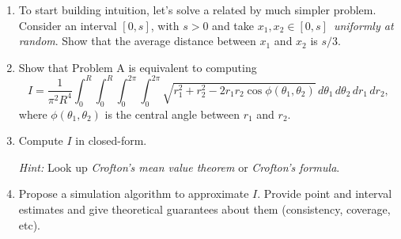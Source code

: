 \documentclass[a4paper,10pt, notitlepage]{report}
\begin{document}
\begin{enumerate}
 \item To start building intuition, let's solve a related by much simpler problem.
 Consider an interval $[0, s]$, with $s>0$ and take $x_1,x_2 \in [0, s]$~\textit{uniformly at random}.
 Show that the average distance between $x_1$ and $x_2$ is $s/3$.
 \item Show that Problem A is equivalent to computing
 \begin{equation*}
  I = \frac{1}{\pi^2 R^4}\int_{0}^{R}\int_{0}^{R}\int_{0}^{2\pi}\int_{0}^{2\pi}\sqrt{r_1^2 + r_2^2 - 2r_1r_2\cos\phi(\theta_1, \theta_2)}\,d\theta_1\,d\theta_2\,dr_1\,dr_2,
 \end{equation*}
 where $\phi(\theta_1, \theta_2)$ is the central angle between $r_1$ and $r_2$.
 \item Compute $I$ in closed-form.

 \textit{Hint:} Look up \textit{Crofton's mean value theorem} or \textit{Crofton's formula}. 
 \item Propose a simulation algorithm to approximate $I$.
 Provide point and interval estimates and give theoretical guarantees about them (consistency, coverage, etc).
\end{enumerate}

% 
% 
% 
\end{document}
